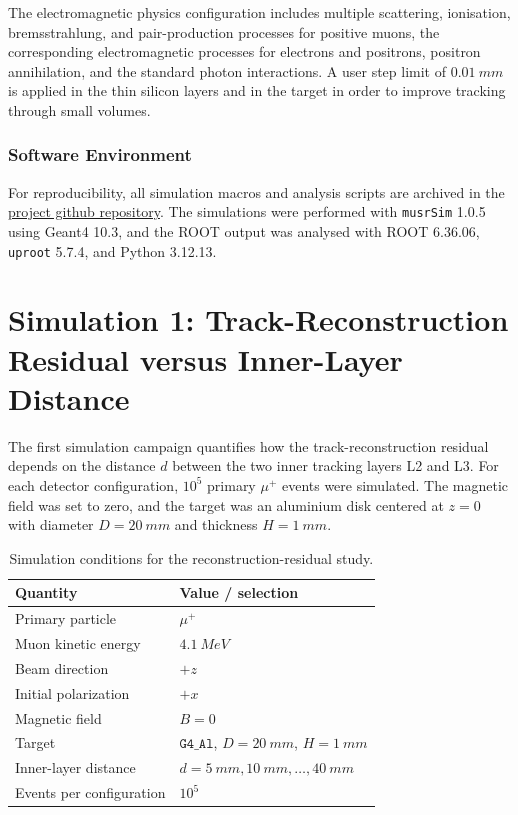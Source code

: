 \documentclass[11pt,a4paper]{article}
\begin{document}
The electromagnetic physics configuration includes multiple scattering, ionisation, bremsstrahlung, and pair-production processes for positive muons, the corresponding electromagnetic processes for electrons and positrons, positron annihilation, and the standard photon interactions. A user step limit of $0.01~\si{mm}$ is applied in the thin silicon layers and in the target in order to improve tracking through small volumes.


\subsubsection*{Software Environment}

For reproducibility, all simulation macros and analysis scripts are archived in
the \href{https://github.com/ekafex/muSR_spectrometer/tree/main/musrSim}{project github repository}. The simulations were performed with \texttt{musrSim}
1.0.5 using Geant4 10.3, and the ROOT output was analysed with ROOT 6.36.06,
\texttt{uproot} 5.7.4, and Python 3.12.13.


\clearpage


\section{Simulation 1: Track-Reconstruction Residual versus Inner-Layer Distance}
\label{sec:sim1}

The first simulation campaign quantifies how the track-reconstruction residual depends on the distance $d$ between the two inner tracking layers L2 and L3. For each detector configuration, $10^5$ primary $\mu^+$ events were simulated. The magnetic field was set to zero, and the target was an aluminium disk centered at $z=0$ with diameter $D=\SI{20}{mm}$ and thickness $H=\SI{1}{mm}$.

\begin{table}[hbt]
\centering
\caption{Simulation conditions for the reconstruction-residual study.}
\label{tab:sim1_conditions}
\begin{tabular}{ll}
\toprule
Quantity & Value / selection \\
\midrule
Primary particle & $\mu^+$ \\
Muon kinetic energy & $\SI{4.1}{MeV}$ \\
Beam direction & $+z$ \\
Initial polarization & $+x$ \\
Magnetic field & $B=0$ \\
Target & $\texttt{G4\_Al}$, $D=\SI{20}{mm}$, $H=\SI{1}{mm}$ \\
Inner-layer distance & $d=\SI{5}{mm}, \SI{10}{mm}, \ldots, \SI{40}{mm}$ \\
Events per configuration & $10^5$ \\
\bottomrule
\end{tabular}
\end{table}
\end{document}
